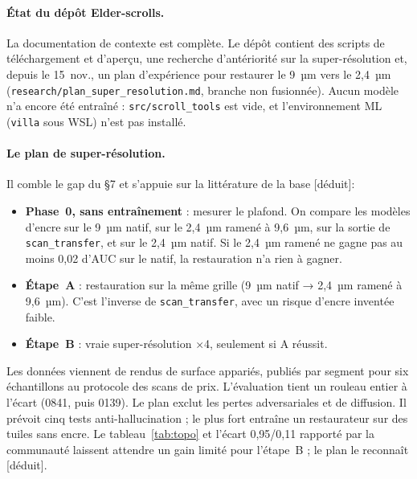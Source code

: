 \documentclass[11pt,a4paper]{article}
\newcommand{\deduit}{\textsf{\small[déduit]}}
\begin{document}
\paragraph{État du dépôt Elder-scrolls.} La documentation de contexte est complète. Le
dépôt contient des scripts de téléchargement et d'aperçu, une recherche d'antériorité sur la
super-résolution et, depuis le 15~nov., un plan d'expérience pour restaurer le 9~µm vers le
2,4~µm (\nolinkurl{research/plan_super_resolution.md}, branche non fusionnée). Aucun modèle
n'a encore été entraîné : \texttt{src/scroll\_tools} est vide, et l'environnement ML
(\texttt{villa} sous WSL) n'est pas installé.

\paragraph{Le plan de super-résolution.} Il comble le gap du §7 et s'appuie sur la
littérature de la base \deduit :
\begin{itemize}
  \item \textbf{Phase~0, sans entraînement} : mesurer le plafond. On compare les modèles
  d'encre sur le 9~µm natif, sur le 2,4~µm ramené à 9,6~µm, sur la sortie de
  \texttt{scan\_transfer}, et sur le 2,4~µm natif. Si le 2,4~µm ramené ne gagne pas au moins
  0,02 d'AUC sur le natif, la restauration n'a rien à gagner.
  \item \textbf{Étape~A} : restauration sur la même grille (9~µm natif → 2,4~µm ramené à
  9,6~µm). C'est l'inverse de \texttt{scan\_transfer}, avec un risque d'encre inventée faible.
  \item \textbf{Étape~B} : vraie super-résolution ×4, seulement si A réussit.
\end{itemize}
Les données viennent de rendus de surface appariés, publiés par segment pour six
échantillons au protocole des scans de prix. L'évaluation tient un rouleau entier à l'écart
(0841, puis 0139). Le plan exclut les pertes adversariales et de diffusion. Il prévoit cinq
tests anti-hallucination ; le plus fort entraîne un restaurateur sur des tuiles sans encre.
Le tableau~\ref{tab:topo} et l'écart 0,95/0,11 rapporté par la communauté laissent attendre
un gain limité pour l'étape~B ; le plan le reconnaît \deduit.
\end{document}
